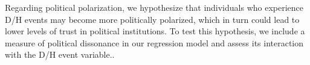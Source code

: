 \documentclass{article}
\begin{document}
Regarding political polarization, we hypothesize that individuals who experience D/H events may become more politically polarized, which in turn could lead to lower levels of trust in political institutions. To test this hypothesis, we include a measure of political dissonance in our regression model and assess its interaction with the D/H event variable..




\end{document}
